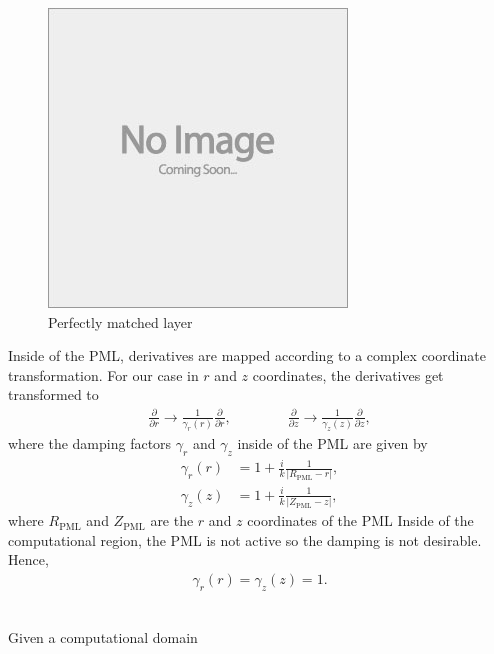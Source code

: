 \begin{figure}[h]
	\centering
	\includegraphics[draft]{images/placeholder}
	\caption{Perfectly matched layer \label{fig:pml}}
\end{figure}


Inside of the PML, derivatives are mapped according to a complex coordinate transformation.
For our case in $r$ and $z$ coordinates, the derivatives get transformed to
\begin{align}
	\frac{\partial}{\partial r} \rightarrow \frac{1}{\gamma_r(r)}\frac{\partial}{\partial r}, \qquad \qquad
	\frac{\partial}{\partial z} \rightarrow \frac{1}{\gamma_z(z)}\frac{\partial}{\partial z},
\end{align}
where the damping factors $\gamma_r$ and $\gamma_z$ inside of the PML are given by
\begin{align}
	\gamma_r(r) &= 1 + \frac{i}{k} \frac{1}{\left| R_{\text{PML}} - r \right|}, \\
	\gamma_z(z) &= 1 + \frac{i}{k} \frac{1}{\left| Z_{\text{PML}} - z \right|},
\end{align}
where $R_{\text{PML}}$ and $Z_{\text{PML}}$ are the $r$ and $z$ coordinates of the PML 
Inside of the computational region, the PML is not active so the damping is not desirable.
Hence,
\begin{align}
	\gamma_r(r) = \gamma_z(z) = 1.
\end{align}



\begin{align}
\end{align}

Given a computational domain 
